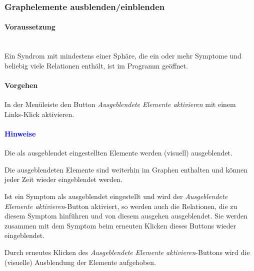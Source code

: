 \documentclass[enabledeprecatedfontcommands,fontsize=11pt,paper=a4,twoside]{scrartcl}
\newcounter{one}
\newcounter{two}[one]
\newcommand*{\hint}{\paragraph{\textcolor{blue}{Hinweise}}}
\newcommand*{\condition}{\paragraph{Voraussetzung}$\;$ \vspace{0.2cm}\\}
\newcommand*{\action}{\paragraph{Vorgehen}}
\let\tempone\itemize
\let\temptwo\enditemize
\renewenvironment{itemize}{\tempone\addtolength{\itemsep}{-10.0pt}}{\temptwo}
\let\origenumerate\enumerate
\let\origendenumerate\endenumerate
\renewenvironment{enumerate}{\origenumerate \addtolength{\itemsep}{-10.0pt}}{\origendenumerate}
\begin{document}
\begin{figure}[ht!]
	\centering
	
\end{figure}

\subsubsection{Graphelemente ausblenden/einblenden}
		\condition 	
		Ein Syndrom mit mindestens einer Sphäre, die ein oder mehr Symptome und beliebig viele Relationen enthält, ist im Programm geöffnet.
		\action
			\begin{enumerate}
				\item In der Menüleiste den Button \textit{Ausgeblendete Elemente aktivieren} mit einem Links-Klick aktivieren.
			\end{enumerate}
		\hint
		\begin{itemize}
				\item Die als ausgeblendet eingestellten Elemente werden (visuell) ausgeblendet. 
				\item Die ausgeblendeten Elemente sind weiterhin im Graphen enthalten und können jeder Zeit wieder eingeblendet werden. 
				\item Ist ein Symptom als ausgeblendet eingestellt und wird der \textit{Ausgeblendete Elemente aktivieren}-Button aktiviert, so werden auch die Relationen, die zu diesem Symptom hinführen und von diesem ausgehen ausgeblendet. Sie werden zusammen mit dem Symptom beim erneuten Klicken dieses Buttons wieder eingeblendet.
				\item Durch erneutes Klicken des \textit{Ausgeblendete Elemente aktivieren}-Buttons wird die (visuelle) Ausblendung der Elemente aufgehoben. \\
		\end{itemize}
		
\end{document}
